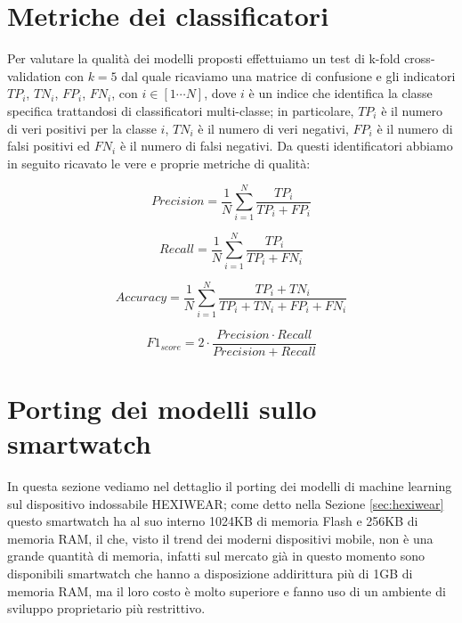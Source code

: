 \section{Metriche dei classificatori}
\label{sec:metriche-dei-classificatori}

Per valutare la qualità dei modelli proposti effettuiamo un test di k-fold cross-validation con $k=5$ dal quale ricaviamo una matrice di confusione e gli indicatori $TP_i$, $TN_i$, $FP_i$, $FN_i$, con $i \in [1\cdots N]$, dove $i$ è un indice che identifica la classe specifica trattandosi di classificatori multi-classe; in particolare, $TP_i$ è il numero di veri positivi per la classe $i$, $TN_i$ è il numero di veri negativi, $FP_i$ è il numero di falsi positivi ed $FN_i$ è il numero di falsi negativi. Da questi identificatori abbiamo in seguito ricavato le vere e proprie metriche di qualità: 

\begin{equation}
    Precision = \dfrac{1}{N} \sum_{i=1}^{N} \dfrac{TP_i}{TP_i + FP_i}
    \label{eq:precision}
\end{equation}

\begin{equation}
    Recall = \dfrac{1}{N} \sum_{i=1}^{N} \dfrac{TP_i}{TP_i + FN_i}
    \label{eq:recall}
\end{equation}

\begin{equation}
    Accuracy = \dfrac{1}{N} \sum_{i=1}^{N} \dfrac{TP_i + TN_i}{TP_i + TN_i + FP_i + FN_i}    
    \label{eq:accuracy}
\end{equation}

\begin{equation}
    F1_{score} = 2 \cdot \dfrac{Precision \cdot Recall}{Precision + Recall}
    \label{eq:f1}
\end{equation}

\section{Porting dei modelli sullo smartwatch}
\label{sec:porting-dei-modelli-sullo-smartwatch}

In questa sezione vediamo nel dettaglio il porting dei modelli di machine learning sul dispositivo indossabile HEXIWEAR; come detto nella Sezione \ref{sec:hexiwear} questo smartwatch ha al suo interno 1024KB di memoria Flash e 256KB di memoria RAM, il che, visto il trend dei moderni dispositivi mobile, non è una grande quantità di memoria, infatti sul mercato già in questo momento sono disponibili smartwatch che hanno a disposizione addirittura più di 1GB di memoria RAM, ma il loro costo è molto superiore e fanno uso di un ambiente di sviluppo proprietario più restrittivo.

